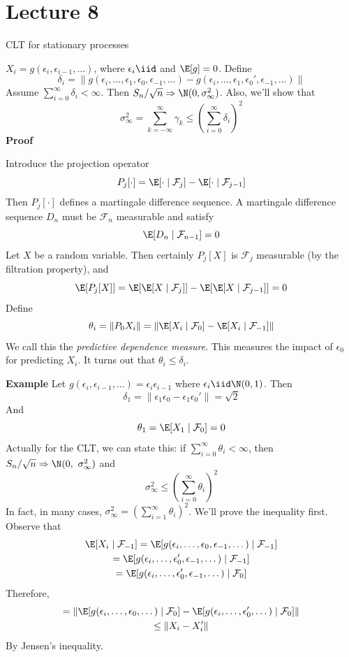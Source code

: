 \section{Lecture 8}

CLT for stationary processes

\(X_i = g(\epsilon_i, \epsilon_{i-1}, \dots)\), where \(\epsilon_i \iid\) and \(\E[g] = 0\). Define
\[\delta_i = \|g(\epsilon_i, \dots, \epsilon_1, \epsilon_0, \epsilon_{-1}, \dots) - g(\epsilon_i, \dots, \epsilon_1, \epsilon_0', \epsilon_{-1}, \dots)\|\]
Assume \(\sum_{i=0}^\infty \delta_i < \infty\). Then \(S_n / \sqrt{n} \Rightarrow \N(0, \sigma_\infty^2)\). Also, we'll show that
\[\sigma^2_\infty = \sum_{k=-\infty}^\infty \gamma_k \leq \left( \sum_{i=0}^\infty \delta_i \right)^2\]
\textbf{Proof}

Introduce the projection operator
\[P_j[\cdot] = \E[\cdot \mid \mathcal F_j] - \E[\cdot \mid \mathcal F_{j-1}]\]
Then \(P_j[\cdot]\) defines a martingale difference sequence. A martingale difference sequence \(D_n\) must be \(\mathcal{F}_n\) measurable and satisfy
\[\E[D_n \mid \mathcal F_{n-1}] = 0\]
Let \(X\) be a random variable. Then certainly \(P_j[X]\) is \(\mathcal{F}_j\) measurable (by the filtration property), and
\[\E[P_j[X]] = \E[\E[X \mid \mathcal{F}_j]] - \E[\E[X \mid \mathcal{F}_{j-1}]] = 0\]
Define
\[\theta_i = \|P_0 X_i\| = \| \E[X_i \mid \mathcal{F}_0] - \E[X_i \mid \mathcal{F}_{-1}]\|\]
We call this the \emph{predictive dependence measure}. This measures the impact of \(\epsilon_0\) for predicting \(X_i\). It turns out that \(\theta_i \leq \delta_i\).

\textbf{Example} Let \(g(\epsilon_i, \epsilon_{i-1}, \dots) = \epsilon_i \epsilon_{i-1}\) where \(\epsilon_i \iid \N(0, 1)\). Then
\[\delta_1 = \|\epsilon_1\epsilon_0 - \epsilon_1 \epsilon_0'\| = \sqrt{2}\]
And
\[\theta_1 = \E[X_1 \mid \mathcal{F}_0] = 0\]
Actually for the CLT, we can state this: if \(\sum_{i=0}^\infty \theta_i < \infty\), then \(S_n / \sqrt{n} \Rightarrow \N(0,\ \sigma^2_\infty)\) and
\[\sigma^2_\infty \leq \left( \sum_{i=0}^\infty \theta_i \right)^2\]
In fact, in many cases, \(\sigma^2_\infty = \left(\sum_{i=1}^\infty \theta_i\right)^2\). We'll prove the inequality first. Observe that
\[\begin{gathered}\E[X_i \mid \mathcal{F}_{-1}] = \E[g(\epsilon_i, \dots, \epsilon_0, \epsilon_{-1}, \dots) \mid \mathcal{F}_{-1}] \\
= \E[g(\epsilon_i, \dots, \epsilon_0', \epsilon_{-1}, \dots) \mid \mathcal{F}_{-1}] \\
= \E[g(\epsilon_i, \dots, \epsilon_0', \epsilon_{-1}, \dots) \mid \mathcal{F}_0]\end{gathered}\]
Therefore,
\[\begin{gathered}= \|\E[g(\epsilon_i, \dots, \epsilon_0, \dots) \mid \mathcal{F}_0] - \E[g(\epsilon_i, \dots, \epsilon_0', \dots)  \mid \mathcal{F}_0]\| \\
\leq \|X_i - X_i'\|\end{gathered}\]
By Jensen's inequality.

